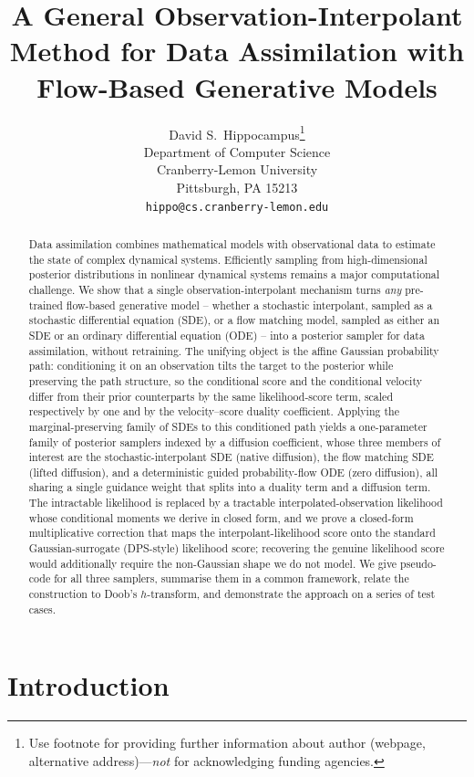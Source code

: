 \documentclass{article}
\title{A General Observation-Interpolant Method for Data Assimilation with Flow-Based Generative Models}
\author{%
  David S.~Hippocampus\thanks{Use footnote for providing further information
    about author (webpage, alternative address)---\emph{not} for acknowledging
    funding agencies.} \\
  Department of Computer Science\\
  Cranberry-Lemon University\\
  Pittsburgh, PA 15213 \\
  \texttt{hippo@cs.cranberry-lemon.edu} \\
}
\theoremstyle{plain}
\theoremstyle{definition}
\theoremstyle{remark}
\begin{document}
\maketitle


\begin{abstract}
Data assimilation combines mathematical models with observational data to estimate the state of complex dynamical systems. Efficiently sampling from high-dimensional posterior distributions in nonlinear dynamical systems remains a major computational challenge. We show that a single observation-interpolant mechanism turns \emph{any} pre-trained flow-based generative model -- whether a stochastic interpolant, sampled as a stochastic differential equation (SDE), or a flow matching model, sampled as either an SDE or an ordinary differential equation (ODE) -- into a posterior sampler for data assimilation, without retraining. The unifying object is the affine Gaussian probability path: conditioning it on an observation tilts the target to the posterior while preserving the path structure, so the conditional score and the conditional velocity differ from their prior counterparts by the same likelihood-score term, scaled respectively by one and by the velocity--score duality coefficient. Applying the marginal-preserving family of SDEs to this conditioned path yields a one-parameter family of posterior samplers indexed by a diffusion coefficient, whose three members of interest are the stochastic-interpolant SDE (native diffusion), the flow matching SDE (lifted diffusion), and a deterministic guided probability-flow ODE (zero diffusion), all sharing a single guidance weight that splits into a duality term and a diffusion term. The intractable likelihood is replaced by a tractable interpolated-observation likelihood whose conditional moments we derive in closed form, and we prove a closed-form multiplicative correction that maps the interpolant-likelihood score onto the standard Gaussian-surrogate (DPS-style) likelihood score; recovering the genuine likelihood score would additionally require the non-Gaussian shape we do not model. We give pseudo-code for all three samplers, summarise them in a common framework, relate the construction to Doob's $h$-transform, and demonstrate the approach on a series of test cases.
\end{abstract}


\section{Introduction}\label{sec:introduction}

\end{document}
